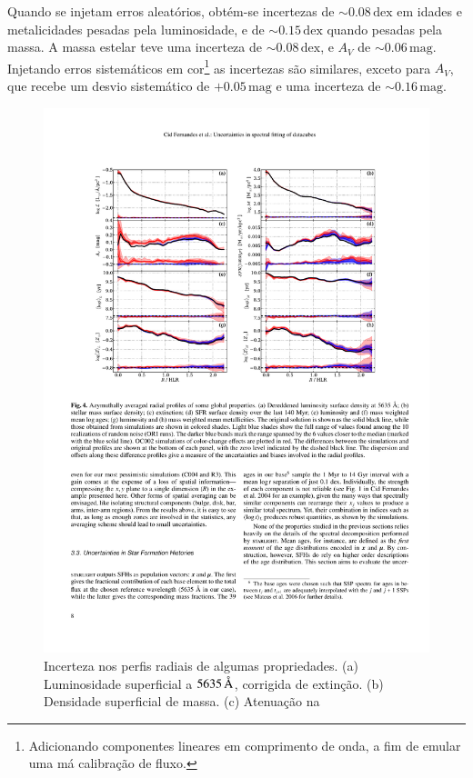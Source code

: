 Quando se injetam erros aleatórios, obtém-se incertezas de $\sim
0.08\,\mathrm{dex}$ em idades e metalicidades pesadas pela luminosidade, e de
$\sim 0.15\,\mathrm{dex}$ quando pesadas pela massa. A massa estelar teve uma
incerteza de $\sim 0.08\,\mathrm{dex}$, e $A_V$ de $\sim 0.06\,\mathrm{mag}$.
Injetando erros sistemáticos em cor\footnote{Adicionando componentes lineares em
comprimento de onda, a fim de emular uma má calibração de fluxo.} as incertezas
são similares, exceto para $A_V$, que recebe um desvio sistemático de
$+0.05\,\mathrm{mag}$ e uma incerteza de $\sim 0.16\,\mathrm{mag}$.

\begin{figure}
	\includegraphics[width=1.0\columnwidth]{figuras/resolving2}
	\caption[Incerteza nos perfis radiais] {Incerteza nos perfis radiais de
	algumas propriedades. (a) Luminosidade superficial a $5635\,\text{\normalfont\AA}$,
	corrigida de extinção. (b) Densidade superficial de massa. (c) Atenuação na
}
\end{figure}
